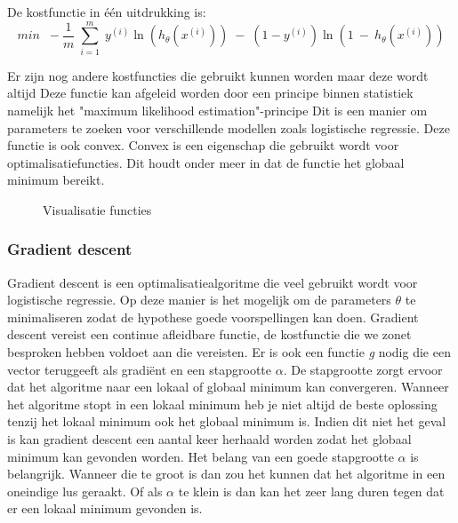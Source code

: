 De kostfunctie in één uitdrukking is: 
$$ 
min \;\; -\frac{1}{m}\;\sum_{i=1}^{m} \;  y^{(i)}\ln(h_{\theta}(x^{(i)})) \;- \;(1-y^{(i)}) \ln(1\:-\:h_{\theta}(x^{(i)}))  
$$

Er zijn nog andere kostfuncties die gebruikt kunnen worden maar deze wordt altijd 
Deze functie kan afgeleid worden door een principe binnen statistiek namelijk het "maximum likelihood estimation"-principe Dit is een manier om parameters te zoeken voor verschillende modellen zoals logistische regressie. Deze functie is ook convex. Convex is een eigenschap die gebruikt wordt voor optimalisatiefuncties. Dit houdt onder meer in dat de functie het globaal minimum bereikt. 

\begin{figure}
	\centering
	\caption{Visualisatie functies}
	\label{fig:kostfunctie}
\end{figure}

\subsubsection{Gradient descent}
\label{sec:gradient-descent}
Gradient descent is een optimalisatiealgoritme die veel gebruikt wordt voor logistische regressie. Op deze manier is het mogelijk om de parameters $\theta$ te minimaliseren zodat de hypothese goede voorspellingen kan doen.
Gradient descent vereist een continue afleidbare functie, de kostfunctie die we zonet besproken hebben voldoet aan die vereisten. Er is ook een functie \textit{g} nodig die een vector teruggeeft als gradiënt en een stapgrootte $\alpha$. De stapgrootte zorgt ervoor dat het algoritme naar een lokaal of globaal minimum kan convergeren. Wanneer het algoritme stopt in een lokaal minimum heb je niet altijd de beste oplossing tenzij het lokaal minimum ook het globaal minimum is. Indien dit niet het geval is kan gradient descent een aantal keer herhaald worden zodat het globaal minimum kan gevonden worden. Het belang van een goede stapgrootte $\alpha$ is belangrijk. Wanneer die te groot is dan zou het kunnen dat het algoritme in een oneindige lus geraakt. Of als $\alpha$ te klein is dan kan het zeer lang duren tegen dat er een lokaal minimum gevonden is. 

